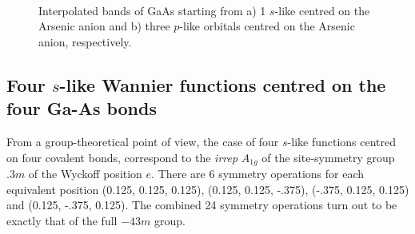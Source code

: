 	\begin{figure}[h!]
	\centering
	\\
	\centering
	\caption{Interpolated \Wannier{} bands of GaAs starting from a) 1 $s$-like centred on the Arsenic anion and b) three $p$-like orbitals centred on the Arsenic anion, respectively.}
	\label{fig21.5}
	\end{figure}

\clearpage

\subsection*{Four $s$-like Wannier functions centred on the four Ga-As bonds}

From a group-theoretical point of view, the case of four $s$-like functions centred on four covalent bonds, correspond to the \textit{irrep} $A_{1g}$ of the site-symmetry group $.3m$ of the Wyckoff position $e$. There are 6 symmetry operations for each equivalent position (0.125, 0.125, 0.125), (0.125, 0.125, -.375), (-.375, 0.125, 0.125) and (0.125, -.375, 0.125). The combined 24 symmetry operations turn out to be exactly that of the full ${-}43m$ group.

